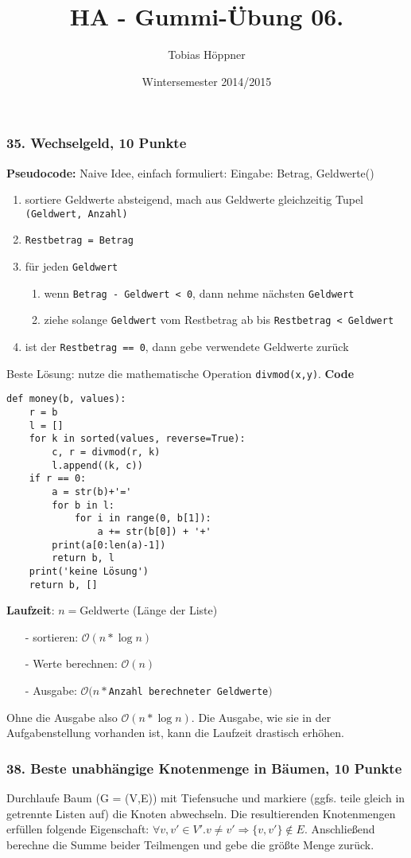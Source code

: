 \documentclass[ngerman,a4paper]{report}
\author{Tobias Höppner}
\title{HA - Gummi-Übung 06.}
\date{Wintersemester 2014/2015}
\renewcommand{\maketitle}{}
\begin{document}
 
\maketitle 

\subsubsection*{35. Wechselgeld, 10 Punkte}
\textbf{Pseudocode:} Naive Idee, einfach formuliert:
Eingabe: Betrag, Geldwerte()
\begin{enumerate}
\item sortiere Geldwerte absteigend, mach aus Geldwerte gleichzeitig Tupel \lstinline!(Geldwert, Anzahl)!
\item \lstinline!Restbetrag = Betrag!
\item für jeden \lstinline!Geldwert!
\begin{enumerate}
\item wenn \lstinline!Betrag - Geldwert < 0!, dann nehme nächsten \lstinline!Geldwert!
\item ziehe solange \lstinline!Geldwert! vom Restbetrag ab bis \lstinline!Restbetrag < Geldwert!
\end{enumerate}
\item ist der \lstinline!Restbetrag == 0!, dann gebe verwendete Geldwerte zurück
\end{enumerate}
Beste Lösung: nutze die mathematische Operation \lstinline!divmod(x,y)!. 
\textbf{Code}
\begin{lstlisting}
def money(b, values):
    r = b
    l = []
    for k in sorted(values, reverse=True):
        c, r = divmod(r, k)
        l.append((k, c))
    if r == 0:
        a = str(b)+'='
        for b in l:
            for i in range(0, b[1]):
                a += str(b[0]) + '+'
        print(a[0:len(a)-1])
        return b, l
    print('keine Lösung')
    return b, []
\end{lstlisting}
\textbf{Laufzeit}: $n = $Geldwerte (Länge der Liste)
\begin{enumerate}
\item[-] sortieren: $\mathcal{O}(n * \log n)$
\item[-] Werte berechnen: $\mathcal{O}(n)$
\item[-] Ausgabe: $\mathcal{O}(n * $\lstinline!Anzahl berechneter Geldwerte!$)$
\end{enumerate}
Ohne die Ausgabe also $\mathcal{O}(n * \log n)$. Die Ausgabe, wie sie in der Aufgabenstellung vorhanden ist, kann die Laufzeit drastisch erhöhen.\\
\subsubsection*{38. Beste unabhängige Knotenmenge in Bäumen, 10 Punkte}
Durchlaufe Baum (G = (V,E)) mit Tiefensuche und markiere (ggfs. teile gleich in getrennte Listen auf) die Knoten abwechseln. Die resultierenden Knotenmengen erfüllen folgende Eigenschaft: $\forall v, v' \in V'. v \neq v' \Rightarrow \{v,v' \} \notin E$.
Anschließend berechne die Summe beider Teilmengen und gebe die größte Menge zurück.
\end{document}
